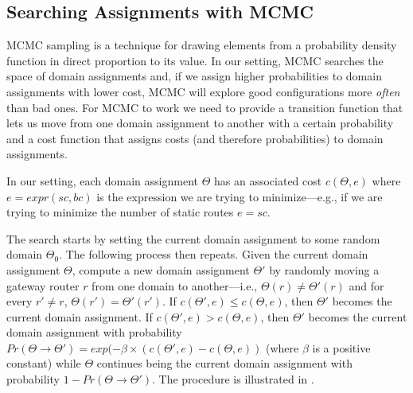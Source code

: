 \subsection{Searching Assignments with MCMC}
MCMC sampling is a technique for 
drawing elements from a
probability density function in direct proportion to its value.
In our setting, MCMC searches the space of domain assignments and,
if we assign higher probabilities to domain assignments with lower cost, MCMC will explore
good configurations more \emph{often} than bad ones.
For MCMC to work we need to provide a transition function that lets us move from one domain assignment
to another with a certain probability and a cost function that assigns costs (and therefore probabilities) to
domain assignments. 

In our setting, each domain assignment $\Theta$
has an associated cost $c(\Theta, e)$
where
$e=expr(sc, bc)$
is the expression we are trying to minimize---e.g., 
if we are trying to minimize the number of static routes $e=sc$.

The search starts by setting the current domain assignment 
to some random domain $\Theta_0$.
The following process then repeats.
Given the current domain
assignment $\Theta$, 
compute a new domain assignment $\Theta'$ by randomly
moving a gateway 
router $r$ from one domain to another---i.e., $\Theta(r){\neq}\Theta'(r)$ and
for every $r'{\neq} r$, $\Theta(r'){=}\Theta'(r')$.
If $c(\Theta',e)\leq c(\Theta,e)$, then $\Theta'$ becomes the current domain assignment.
If $c(\Theta',e)>c(\Theta,e)$, then $\Theta'$ becomes the current domain assignment
with probability $Pr(\Theta \rightarrow \Theta')= exp(-\beta\times(c(\Theta',e) - c(\Theta,e))$ (where $\beta$ is a positive constant) 
while 
 $\Theta$ continues being the current domain assignment with probability $1-Pr(\Theta \rightarrow \Theta')$.
\iffull
The procedure is illustrated in .
\fi

